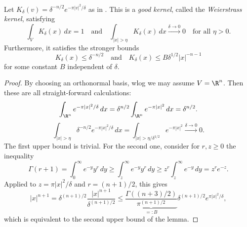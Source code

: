 \begin{lemma}
\label{lem:weierstrass-kernel}
Let $K_\delta(v)=\delta^{-n/2}e^{-\pi|v|^2/\delta}$
as in . This is a
\emph{good kernel}, called the \emph{Weierstrass kernel}, satisfying
$$\int_{V}K_\delta(x)\,dx= 1\quad\text{and}\quad
\int_{|x|>\eta}K_\delta(x)\,dx\xrightarrow{\delta\to0}0\quad\text{for all }\eta>0.$$
Furthermore, it satisfies the stronger bounds
$$K_\delta(x)\leq \delta^{-n/2}\quad\text{and}\quad K_\delta(x)\leq B\delta^{1/2}|x|^{-n-1}$$ for
some constant $B$ independent of $\delta$.
\end{lemma}
\begin{proof}
  By choosing an orthonormal basis, wlog we may assume $V=\R^n$. Then these are all straight-forward calculations:
  $$\int_{\R^n}e^{-\pi|x|^2/\delta}\,dx=\delta^{n/2}\int_{\R^n}e^{-\pi|x|^2}\,dx=\delta^{n/2}.$$
  $$\int_{|x|>\eta}\delta^{-n/2}e^{-\pi|x|^2/\delta}\,dx=\int_{|x|>\eta/\delta^{1/2}}e^{-\pi|x|^2}\xrightarrow{\delta\to0}0.$$
  The first upper bound is trivial. For the second one, consider for $r,z\geq0$ the inequality
  $$\Gamma(r+1)=\int_0^\infty e^{-y}y^r\,dy\geq\int_z^\infty e^{-y}y^r\,dy\geq z^r\int_z^\infty e^{-y}\,dy=z^re^{-z}.$$
  Applied to $z=\pi|x|^2/\delta$ and $r=(n+1)/2$, this gives
  $$|x|^{n+1}=\delta^{(n+1)/2}\frac{|x|^{n+1}}{\delta^{(n+1)/2}}\leq
  \underbrace{\frac{\Gamma((n+3)/2)}{\pi^{(n+1)/2}}}_{=:B}\delta^{(n+1)/2}e^{\pi|x|^2/\delta},$$
  which is equivalent to the second upper bound of the lemma.
\end{proof}

